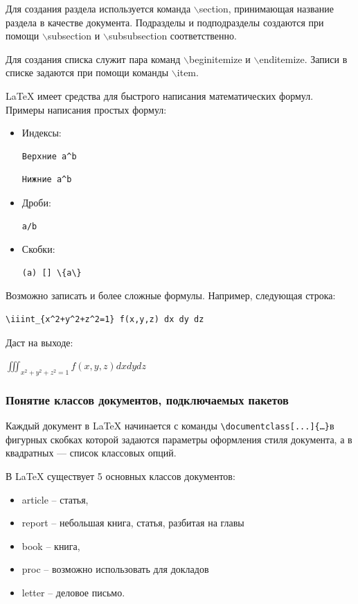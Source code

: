 \documentclass[12pt,a4paper]{article}
\begin{document}
Для создания раздела используется команда $\backslash$section, принимающая название раздела в качестве документа. Подразделы и подподразделы создаются при помощи $\backslash$subsection и $\backslash$subsubsection соответственно.

Для создания списка служит пара команд $\backslash$begin{itemize} и $\backslash$end{itemize}. Записи в списке задаются при помощи команды $\backslash$item.

LaTeX имеет средства для быстрого написания математических формул. Примеры написания простых формул:
\begin{itemize}
\item Индексы:
\begin{verbatim}Верхние a^b
\end{verbatim}
\begin{verbatim}Нижние a^b
\end{verbatim}
\item Дроби:
\begin{verbatim}a/b
\end{verbatim}
\item Скобки:
\begin{verbatim}(a) [] \{a\}
\end{verbatim}
\end{itemize}

Возможно записать и более сложные формулы. Например, следующая строка: \begin{center}
\begin{verbatim}
\iiint_{x^2+y^2+z^2=1} f(x,y,z) dx dy dz
\end{verbatim}
\end{center}

Даст на выходе:
\begin{center}
$\iiint_{x^2+y^2+z^2=1} f(x,y,z) dx dy dz $
\end{center}
\subsubsection{Понятие классов документов, подключаемых пакетов}
Каждый документ в LaTeX начинается с команды \verb+\documentclass[...]{…}+в фигурных скобках которой задаются параметры оформления стиля документа, а в квадратных — список классовых опций.

В LaTeX существует 5 основных классов документов: 
\begin{itemize}
\item article -- статья,
\item report -- небольшая книга, статья, разбитая на главы
\item book -- книга,
\item proc -- возможно использовать для докладов
\item letter -- деловое письмо. 
\end{itemize}
\end{document}
